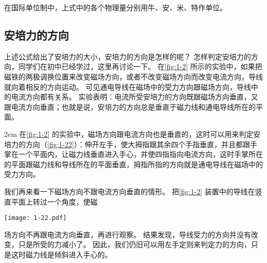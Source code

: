 在国际单位制中，上式中的各个物理量分别用牛、安、米、特作单位。

\subsection{安培力的方向}
上述公式给出了安培力的大小，安培力的方向是怎样的呢？
怎样判定安培力的方向，同学们在初中已经学过，这里再讨论一下。
在\cref{fig:1-2} 所示的实验中，如果把磁铁的两极调换位置来改变磁场方向，或者不改变磁场方向而改变电流方向，导线就向着相反的方向运动。
可见通电导线在磁场中的受力方向跟磁场方向，导线中的电流方向都有关系。
实验表明：电流所受安培力的方向既跟磁场方向垂直，又跟电流方向垂直；也就是说，安培力的方向总是垂直于磁力线和通电导线所在的平面。

\medskip\noindent
\begin{minipage}{0.7\linewidth}\parindent2em
在\cref{fig:1-2} 的实验中，磁场方向跟电流方向也是垂直的，这时可以用来判定安培力的方向（\cref{fig:1-22}）：伸开左手，使大拇指跟其余四个手指垂直，并且都跟手掌在一个平面内，让磁力线垂直进入手心，并使四指指向电流方向，这时手掌所在的平面跟磁力线和导线所在的平面垂直，拇指所指的方向就是通电导线在磁场中的受力方向。

我们再来看一下磁场方向不跟电流方向垂直的情形。
把\cref{fig:1-2} 装置中的导线在竖直平面上转过一个角度，使磁
\end{minipage}\hfill
\begin{minipage}{0.25\linewidth}\centering
\begin{figurehere}
  \texttt{[image: 1-22.pdf]}
  \caption{}\label{fig:1-22}
\end{figurehere}
\end{minipage}

\medskip\noindent
场方向不再跟电流方向垂直，再进行观察。
结果发现，导线受力的方向并没有改变，只是所受的力减小了。
因此，我们仍旧可以用左手定则来判定力的方向，只是这时磁力线是倾斜进入手心的。


